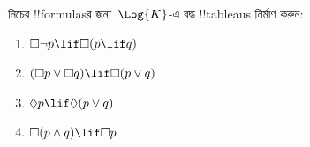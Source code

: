 \documentclass[../../../include/open-logic-section]{subfiles}
\begin{document}
\begin{prob}
  নিচের !!{formula}sর জন্য~$\Log{K}$-এ বদ্ধ !!{tableau}s নির্মাণ করুন:
  \begin{enumerate}
    \item $\Box \lnot p \lif \Box(p \lif q)$
    \item $(\Box p \lor \Box q) \lif \Box(p \lor q)$
    \item $\Diamond p \lif \Diamond(p \lor q)$
    \item $\Box(p \land q) \lif \Box p$
  \end{enumerate}
\end{prob}
\end{document}
